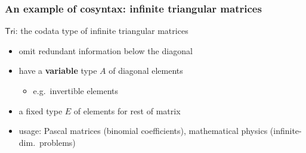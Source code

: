 \documentclass[
serif,
mathsans,
]
{beamer}
\newcommand{\constfont}[1]{\ensuremath{\mathsf{#1}}}
\newcommand{\Tri}{\constfont{Tri}}
\newcommand{\fat}[1]{\textbf{#1}}
\begin{document}
\begin{frame}
 \frametitle{An example of cosyntax: infinite triangular matrices}
 
   \begin{block}{\Tri: the codata type of infinite triangular matrices}
     \begin{itemize}
      \item omit redundant information below the diagonal
      \item have a \fat{variable} type $A$ of diagonal elements 
        \begin{itemize} 
          \item e.g.\ invertible elements
        \end{itemize}
      \item a fixed type $E$ of elements for rest of matrix
      \item usage: Pascal matrices (binomial coefficients), mathematical physics (infinite-dim.\ problems)
     \end{itemize}
   \end{block}
   
   
\begin{center}
   
 
%

\end{center}
 

   
\end{frame}
\end{document}
